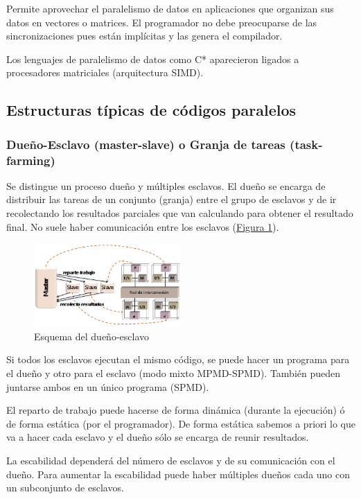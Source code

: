 \documentclass[10pt,a4paper,spanish]{report}
\begin{document}
Permite aprovechar el paralelismo de datos en aplicaciones que organizan sus datos en vectores o matrices. El programador no debe preocuparse de las sincronizaciones pues están implícitas y las genera el compilador.

Los lenguajes de paralelismo de datos como C* aparecieron ligados a procesadores matriciales (arquitectura SIMD). 

\textcolor[rgb]{0.2,0.4,0.8}{\subsection{Estructuras típicas de códigos paralelos}}
\textcolor[rgb]{0.2,0.4,0.8}{\subsubsection{Dueño-Esclavo (master-slave) o Granja de tareas (task-farming)}}
Se distingue un proceso dueño y múltiples esclavos. El dueño se encarga de distribuir las tareas de un conjunto (granja) entre el grupo de esclavos y de ir recolectando los resultados parciales que van calculando para obtener el resultado final. No suele haber comunicación entre los esclavos (\hyperref[master_slave]{Figura \ref*{master_slave}}).

\begin{figure}[!h]
    \centering
    \includegraphics[width=0.5\textwidth]{35}
    \caption{Esquema del dueño-esclavo}
    \label{master_slave}
\end{figure}

Si todos los esclavos ejecutan el mismo código, se puede hacer un programa para el dueño y otro para el esclavo (modo mixto MPMD-SPMD). También pueden juntarse ambos en un único programa (SPMD).

El reparto de trabajo puede hacerse de forma dinámica (durante la ejecución) ó de forma estática (por el programador). De forma estática sabemos a priori lo que va a hacer cada esclavo y el dueño sólo se encarga de reunir resultados.

La escabilidad dependerá del número de esclavos y de su comunicación con el dueño. Para aumentar la escabilidad puede haber múltiples dueños cada uno con un subconjunto de esclavos.
\end{document}
